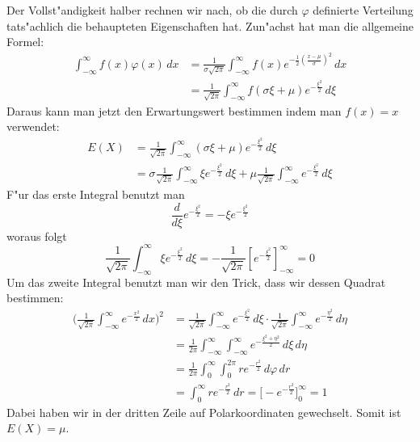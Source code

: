 Der Vollst"andigkeit halber rechnen wir nach, ob die durch $\varphi$
definierte Verteilung tats"achlich die behaupteten Eigenschaften hat.
Zun"achst hat man die allgemeine Formel:
\begin{align*}
\int_{-\infty}^{\infty}f(x)\varphi(x)\,dx
&=\frac1{\sigma\sqrt{2\pi}}\int_{-\infty}^{\infty}f(x)e^{-\frac{1}{2}\left(\frac{x-\mu}{\sigma}\right)^2}\,dx\\
&=\frac1{\sqrt{2\pi}}\int_{-\infty}^{\infty}f(\sigma\xi+\mu)e^{-\frac{\xi^2}2}\,d\xi
\end{align*}
Daraus kann man jetzt den Erwartungswert bestimmen indem man $f(x)=x$ verwendet:
\begin{align*}
E(X)
&=\frac1{\sqrt{2\pi}}\int_{-\infty}^{\infty}(\sigma\xi+\mu)e^{-\frac{\xi^2}2}\,d\xi\\
&=\sigma\frac1{\sqrt{2\pi}}\int_{-\infty}^{\infty}\xi e^{-\frac{\xi^2}2}\,d\xi+
\mu\frac1{\sqrt{2\pi}}\int_{-\infty}^{\infty}e^{-\frac{\xi^2}2}\,d\xi
\end{align*}
F"ur das erste Integral benutzt man
\[
\frac{d}{d\xi}e^{-\frac{\xi^2}{2}}=-\xi e^{-\frac{\xi^2}{2}}
\]
woraus folgt
\[
\frac1{\sqrt{2\pi}}\int_{-\infty}^{\infty}\xi e^{-\frac{\xi^2}2}\,d\xi
=
-\frac1{\sqrt{2\pi}}\left[
 e^{-\frac{\xi^2}2}
\right]_{-\infty}^{\infty}=0
\]
Um das zweite Integral benutzt man wir den Trick, dass wir dessen
Quadrat bestimmen:
\begin{align*}
\biggl(\frac{1}{\sqrt{2\pi}}\int_{-\infty}^{\infty}e^{-\frac{x^2}2}\,dx\biggr)^2
&=
\frac1{\sqrt{2\pi}}\int_{-\infty}^{\infty} e^{-\frac{\xi^2}2}\,d\xi\cdot
\frac1{\sqrt{2\pi}}\int_{-\infty}^{\infty} e^{-\frac{\eta^2}2}\,d\eta\\
&=
\frac1{2\pi}\int_{-\infty}^{\infty}\int_{-\infty}^{\infty}
e^{-\frac{\xi^2+\eta^2}2}
\,d\xi\,d\eta\\
&=
\frac1{2\pi}\int_{0}^{\infty}\int_{0}^{2\pi}re^{-\frac{r^2}2}\,d\varphi\,dr\\
&=\int_0^{\infty}re^{-\frac{r^2}2}\,dr
=\bigl[-e^{-\frac{r^2}2}\bigr]_0^{\infty}
=1
\end{align*}
Dabei haben wir in der dritten Zeile auf Polarkoordinaten gewechselt.
Somit ist $E(X)=\mu$.

